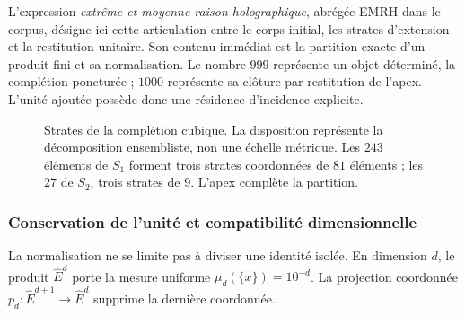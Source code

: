 L'expression \emph{extrême et moyenne raison holographique}, abrégée EMRH dans
le corpus, désigne ici cette articulation entre le corps initial, les
strates d'extension et la restitution unitaire. Son contenu immédiat
est la partition exacte d'un produit fini et sa normalisation. Le nombre
\(999\) représente un objet déterminé, la complétion poncturée ;
\(1000\) représente sa clôture par restitution de l'apex. L'unité
ajoutée possède donc une résidence d'incidence explicite.

\begin{figure}[htbp]
\centering
{}
\caption{Strates de la complétion cubique. La disposition représente
la décomposition ensembliste, non une échelle métrique. Les \(243\) éléments
de \(S_1\) forment trois strates coordonnées de \(81\) éléments ; les \(27\)
de \(S_2\), trois strates de \(9\). L'apex complète la partition.}
\label{fig:revision-emrh}
\end{figure}



\subsubsection{Conservation de l'unité et compatibilité dimensionnelle}

La normalisation ne se limite pas à diviser une identité isolée. En dimension
\(d\), le produit \(\widehat E^d\) porte la mesure uniforme
\(\mu_d(\{x\})=10^{-d}\). La projection coordonnée
\(p_d:\widehat E^{d+1}\to\widehat E^d\) supprime la dernière coordonnée.

